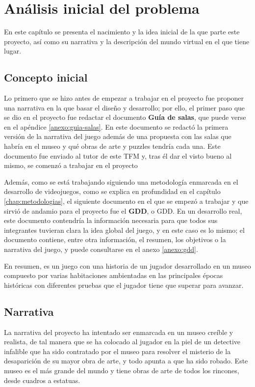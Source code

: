 \chapter{Análisis inicial del problema}
\label{chap:analisis_problema}

En este capítulo se presenta el nacimiento y la idea inicial de la que parte este proyecto, así como su narrativa y la descripción del mundo virtual en el que tiene lugar.

\section{Concepto inicial}

Lo primero que se hizo antes de empezar a trabajar en el proyecto fue proponer una narrativa en la que basar el diseño y desarrollo; por ello, el primer paso que se dio en el proyecto fue redactar el documento \textbf{Guía de salas}, que puede verse en el apéndice \ref{anexo:guia-salas}. En este documento se redactó la primera versión de la narrativa del juego además de una propuesta con las salas que habría en el museo y qué obras de arte y puzzles tendría cada una. Este documento  fue enviado al tutor de este \acs{TFM} y, tras él dar el visto bueno al mismo, se comenzó a trabajar en el proyecto

Además, como se está trabajando siguiendo una metodología enmarcada en el desarrollo de videojuegos, como se explica en profundidad en el capítulo \ref{chap:metodologias}, el siguiente documento en el que se empezó a trabajar y que sirvió de andamio para el proyecto fue el \textbf{\acl{GDD}}, o \acs{GDD}. En un desarrollo real, este documento contendría la información necesaria para que todos sus integrantes tuvieran clara la idea global del juego, y en este caso es lo mismo; el documento contiene, entre otra información, el resumen, los objetivos o la narrativa del juego, y puede consultarse en el anexo \ref{anexo:gdd}.

En resumen, \MineRVa es un juego con una historia de un jugador desarrollado en un museo compuesto por varias habitaciones ambientadas en las principales épocas históricas con diferentes pruebas que el jugador tiene que superar para avanzar.

\section{Narrativa}

La narrativa del proyecto ha intentado ser enmarcada en un museo creíble y realista, de tal manera que se ha colocado al jugador en la piel de un detective infalible que ha sido contratado por el museo para resolver el misterio de la desaparición de su mayor obra de arte, y todo apunta a que ha sido robado. Este museo es el más grande del mundo y tiene obras de arte de todos los rincones, desde cuadros a estatuas.

